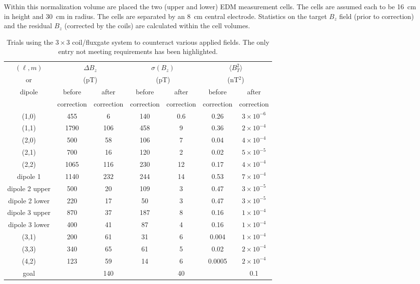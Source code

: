 \documentclass[preprint,12pt]{elsarticle}
\begin{document}
Within this normalization volume are placed the two (upper and lower)
EDM measurement cells.  The cells are assumed each to be 16~cm in
height and 30~cm in radius.  The cells are separated by an 8~cm
central electrode.  Statistics on the target $B_z$ field (prior to
correction) and the residual $B_z$ (corrected by the coils) are
calculated within the cell volumes.

\begin{table}
  \begin{center}
    \begin{tabular}{ccccccc}
      $(\ell,m)$ & \multicolumn{2}{c}{$\Delta B_z$} & \multicolumn{2}{c}{$\sigma(B_z)$} & \multicolumn{2}{c}{$\langle B_T^2\rangle$}\\
      or &  \multicolumn{2}{c}{(pT)} & \multicolumn{2}{c}{(pT)} & \multicolumn{2}{c}{(nT$^2$)} \\\cline{2-7}
      dipole & before & after & before & after & before & after \\
      & correction & correction & correction & correction & correction & correction \\\hline
      (1,0) & 455 &  6 & 140 & 0.6 & 0.26 & $3\times 10^{-6}$ \\
      (1,1) &1790 &106 & 458 & 9 & 0.36 & $2\times 10^{-4}$ \\
      (2,0) & 500 & 58 & 106 & 7 & 0.04 & $4\times 10^{-4}$ \\
      (2,1) & 700 & 16 & 120 & 2 & 0.02 & $5\times 10^{-5}$ \\
      (2,2) &1065 &116 & 230 &12 & 0.17 & $4\times 10^{-4}$ \\
      dipole 1 &1140&$\boxed{232}$ & 244 &14 & 0.53 & $7\times 10^{-4}$ \\
      dipole 2 upper&500& 20 & 109 & 3 & 0.47 & $3\times 10^{-5}$ \\
      dipole 2 lower&220& 17 &  50 & 3 & 0.47 & $3\times 10^{-5}$ \\
      dipole 3 upper&870& 37 & 187 & 8 & 0.16 & $1\times 10^{-4}$ \\
      dipole 3 lower&400& 41 &  87 & 4 & 0.16 & $1\times 10^{-4}$ \\
      (3,1) & 200 & 61 &  31 & 6 & 0.004& $1\times 10^{-4}$ \\
      (3,3) & 340 & 65 &  61 & 5 & 0.02 & $2\times 10^{-4}$ \\
      (4,2) & 123 & 59 &  14 & 6 & 0.0005&$2\times 10^{-4}$ \\
      \hline
      goal & & 140 & & 40 & & 0.1 \\
    \end{tabular}
    \caption{Trials using the $3\times 3$ coil/fluxgate system to
      counteract various applied fields.  The only entry not meeting
      requirements has been highlighted.\label{tab:trials}}
  \end{center}
\end{table}
\end{document}
